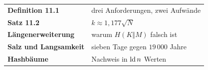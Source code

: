 \begin{merksatz}
\begin{center}
\renewcommand{\arraystretch}{1.5}
\begin{tabular}{@{}P{3.4cm}P{5.2cm}@{}}
\toprule
\textbf{Definition 11.1} & drei Anforderungen, zwei Aufwände\\
\textbf{Satz 11.2} & $k \approx 1{,}177\sqrt N$\\
\textbf{Längen\-erweiterung} & warum $H(K\Vert M)$ falsch ist\\
\textbf{Salz und Langsamkeit} & sieben Tage gegen $19\,000$ Jahre\\
\textbf{Hashbäume} & Nachweis in $\operatorname{ld} n$ Werten\\
\bottomrule
\end{tabular}
\end{center}

\begin{center}
\begin{minipage}{0.88\textwidth}
\end{minipage}
\end{center}
\end{merksatz}
